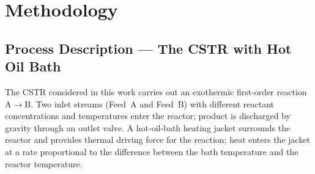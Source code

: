 \documentclass[12pt,a4paper]{article}
\begin{document}
\section{Methodology}

\subsection{Process Description — The CSTR with Hot Oil Bath}

The CSTR considered in this work carries out an exothermic first-order
reaction $\mathrm{A}\to\mathrm{B}$. Two inlet streams (Feed~A and Feed~B) with
different reactant concentrations and temperatures enter the reactor; product
is discharged by gravity through an outlet valve. A hot-oil-bath heating
jacket surrounds the reactor and provides thermal driving force for the
reaction; heat enters the jacket at a rate proportional to the difference
between the bath temperature and the reactor temperature.
\end{document}
